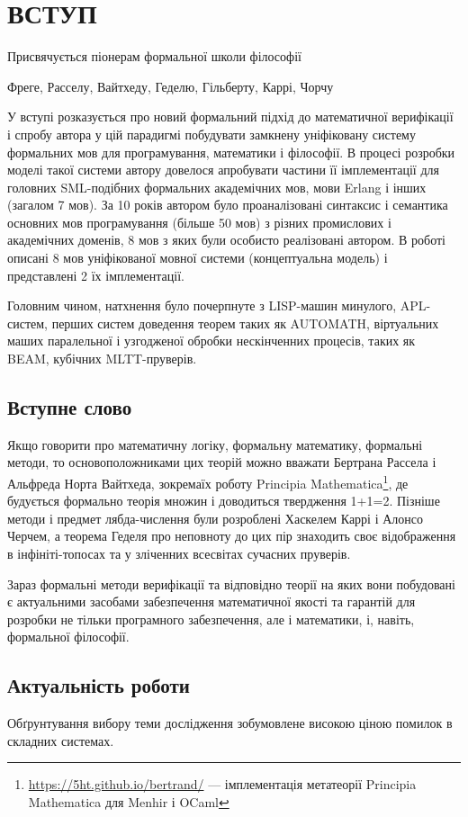 \chapter*{ВСТУП}
\epigraph{Присвячується піонерам формальної школи філософії}
         {Фреге, Расселу, Вайтхеду, Геделю, Гільберту, Каррі, Чорчу}

У вступі розказується про новий формальний підхід до математичної верифікації і спробу автора
у цій парадигмі побудувати замкнену уніфіковану систему формальних мов для
програмування, математики і філософії. В процесі розробки моделі такої системи автору
довелося апробувати частини її імплементації для головних SML-подібних формальних академічних мов,
мови Erlang і інших (загалом 7 мов). За 10 років автором було проаналізовані
синтаксис і семантика основних мов програмування (більше 50 мов) з різних промислових
і академічних доменів, 8 мов з яких були особисто реалізовані автором. В роботі
описані 8 мов уніфікованої мовної системи (концептуальна модель) і представлені 2 їх імплементації.

Головним чином, натхнення було почерпнуте з LISP-машин минулого, APL-систем,
перших систем доведення теорем таких як AUTOMATH, віртуальних маших паралельної
і узгодженої обробки нескінченних процесів, таких як BEAM, кубічних MLTT-пруверів.

\section*{Вступне слово}
Якщо говорити про математичну логіку, формальну математику, формальні методи,
то основоположниками цих теорій можно вважати Бертрана Рассела і Альфреда Норта Вайтхеда, зокремаїх роботу
Principia Mathematica\footnote{\url{https://5ht.github.io/bertrand/} --- імплементація
метатеорії Principia Mathematica для Menhir і OCaml},
де будується формально теорія множин і доводиться твердження 1+1=2. Пізніше методи і предмет
лябда-числення були розроблені Хаскелем Каррі і Алонсо Черчем, а теорема Геделя про неповноту до цих пір
знаходить своє відображення в інфініті-топосах та у зліченних всесвітах сучасних пруверів.

Зараз формальні методи верифікації та відповідно теорії на яких вони побудовані
є актуальними засобами забезпечення математичної якості та гарантій для розробки не тільки
програмного забезпечення, але і математики, і, навіть, формальної філософії.

\section{Актуальність роботи}
Обґрунтування вибору теми дослідження зобумовлене високою ціною помилок в складних системах.

